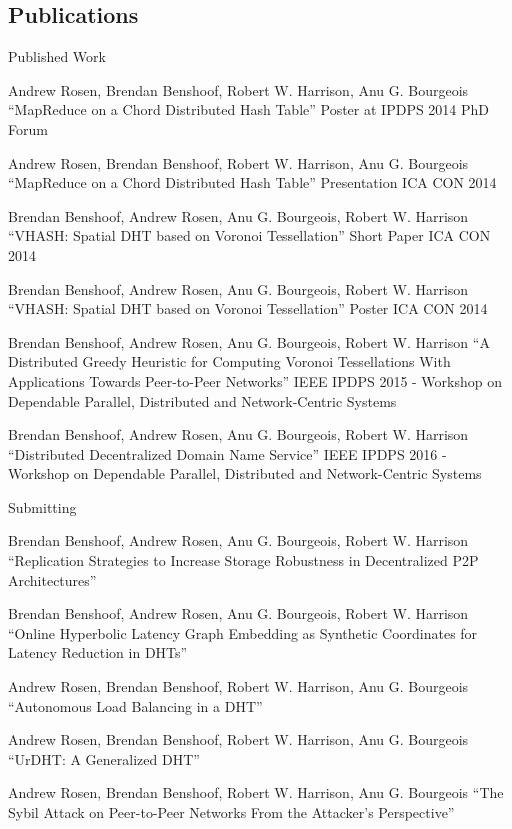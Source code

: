 \documentclass[11pt]{beamer}
\begin{document}
\subsection{Publications}
\begin{frame}{Published Work}
 	\begin{itemize}\tiny{
		\item Andrew Rosen, Brendan Benshoof, Robert W. Harrison, Anu G. Bourgeois ``MapReduce on a Chord Distributed Hash Table'' Poster at IPDPS 2014 PhD Forum
		\item Andrew Rosen, Brendan Benshoof, Robert W. Harrison, Anu G. Bourgeois ``MapReduce on a Chord Distributed Hash Table'' Presentation ICA CON 2014
		\item Brendan Benshoof, Andrew Rosen, Anu G. Bourgeois, Robert W. Harrison ``VHASH: Spatial DHT based on Voronoi Tessellation'' Short Paper ICA CON 2014 
		\item Brendan Benshoof, Andrew Rosen, Anu G. Bourgeois, Robert W. Harrison ``VHASH: Spatial DHT based on Voronoi Tessellation'' Poster ICA CON 2014 
		\item Brendan Benshoof, Andrew Rosen, Anu G. Bourgeois, Robert W. Harrison ``A Distributed Greedy Heuristic for Computing Voronoi Tessellations With Applications Towards Peer-to-Peer Networks'' IEEE IPDPS 2015 - Workshop on Dependable Parallel, Distributed and Network-Centric Systems}
		\item Brendan Benshoof, Andrew Rosen, Anu G. Bourgeois, Robert W. Harrison
	``Distributed Decentralized Domain Name Service''
	IEEE IPDPS 2016 - Workshop on Dependable Parallel, Distributed and Network-Centric Systems
	
	\end{itemize}
	
\end{frame}


\begin{frame}{Submitting}
	\begin{itemize}\footnotesize{
		\item Brendan Benshoof, Andrew Rosen, Anu G. Bourgeois, Robert W. Harrison ``Replication Strategies to Increase Storage Robustness in Decentralized P2P Architectures''
		\item Brendan Benshoof, Andrew Rosen, Anu G. Bourgeois, Robert W. Harrison ``Online Hyperbolic Latency Graph Embedding as Synthetic Coordinates for Latency Reduction in DHTs''
		\item Andrew Rosen, Brendan Benshoof, Robert W. Harrison, Anu G. Bourgeois ``Autonomous Load Balancing in a DHT''
		\item Andrew Rosen, Brendan Benshoof, Robert W. Harrison, Anu G. Bourgeois ``UrDHT: A Generalized DHT''
		\item Andrew Rosen, Brendan Benshoof, Robert W. Harrison, Anu G. Bourgeois ``The Sybil Attack on Peer-to-Peer Networks From the Attacker's Perspective''}
	\end{itemize}
\end{frame}
\end{document}
